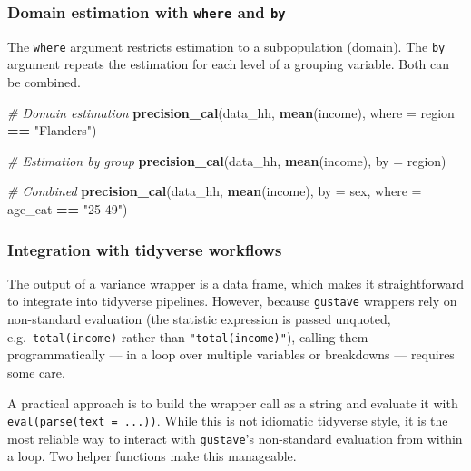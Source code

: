 \documentclass[
]{article}
\newenvironment{Shaded}{\begin{snugshade}}{\end{snugshade}}
\newcommand{\AttributeTok}[1]{\textcolor[rgb]{0.13,0.29,0.53}{#1}}
\newcommand{\CommentTok}[1]{\textcolor[rgb]{0.56,0.35,0.01}{\textit{#1}}}
\newcommand{\FunctionTok}[1]{\textcolor[rgb]{0.13,0.29,0.53}{\textbf{#1}}}
\newcommand{\NormalTok}[1]{#1}
\newcommand{\SpecialCharTok}[1]{\textcolor[rgb]{0.81,0.36,0.00}{\textbf{#1}}}
\newcommand{\StringTok}[1]{\textcolor[rgb]{0.31,0.60,0.02}{#1}}
\begin{document}
\subsubsection{\texorpdfstring{Domain estimation with \texttt{where} and
\texttt{by}}{Domain estimation with where and by}}\label{domain-estimation-with-where-and-by}

The \texttt{where} argument restricts estimation to a subpopulation
(domain). The \texttt{by} argument repeats the estimation for each level
of a grouping variable. Both can be combined.

\begin{Shaded}
\begin{Highlighting}[]
\CommentTok{\# Domain estimation}
\FunctionTok{precision\_cal}\NormalTok{(data\_hh, }\FunctionTok{mean}\NormalTok{(income), }\AttributeTok{where =}\NormalTok{ region }\SpecialCharTok{==} \StringTok{"Flanders"}\NormalTok{)}

\CommentTok{\# Estimation by group}
\FunctionTok{precision\_cal}\NormalTok{(data\_hh, }\FunctionTok{mean}\NormalTok{(income), }\AttributeTok{by =}\NormalTok{ region)}

\CommentTok{\# Combined}
\FunctionTok{precision\_cal}\NormalTok{(data\_hh, }\FunctionTok{mean}\NormalTok{(income), }\AttributeTok{by =}\NormalTok{ sex, }\AttributeTok{where =}\NormalTok{ age\_cat }\SpecialCharTok{==} \StringTok{"25{-}49"}\NormalTok{)}
\end{Highlighting}
\end{Shaded}

\subsubsection{Integration with tidyverse
workflows}\label{integration-with-tidyverse-workflows}

The output of a variance wrapper is a data frame, which makes it
straightforward to integrate into tidyverse pipelines. However, because
\texttt{gustave} wrappers rely on non-standard evaluation (the statistic
expression is passed unquoted, e.g.~\texttt{total(income)} rather than
\texttt{"total(income)"}), calling them programmatically --- in a loop
over multiple variables or breakdowns --- requires some care.

A practical approach is to build the wrapper call as a string and
evaluate it with \texttt{eval(parse(text\ =\ ...))}. While this is not
idiomatic tidyverse style, it is the most reliable way to interact with
\texttt{gustave}'s non-standard evaluation from within a loop. Two
helper functions make this manageable.
\end{document}
